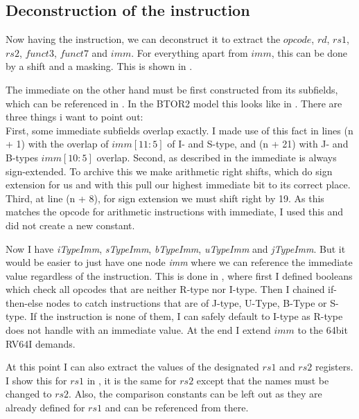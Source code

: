 \subsection{Deconstruction of the instruction}
Now having the instruction, we can deconstruct it to extract the
$opcode$, $rd$, $rs1$, $rs2$, $funct3$, $funct7$ and $imm$. For
everything apart from $imm$, this can be done by a shift and a
masking. This is shown in .

The immediate on the other hand must be first constructed from its
subfields, which can be referenced in . In
the BTOR2 model this looks like in .
 There are three things i
want to point out:\\ First, some immediate subfields overlap exactly.
I made use of this fact in lines (n + 1) with the overlap of
$imm[11:5]$ of I- and S-type, and (n + 21) with J- and B-types
$imm[10:5]$ overlap. Second, as described in 
the immediate is always sign-extended. To archive this we make
arithmetic right shifts, which do sign extension for us and with this
pull our highest immediate bit to its correct place. Third, at line
(n + 8), for sign extension we must shift right by 19. As this
matches the opcode for arithmetic instructions with immediate, I used
this and did not create a new constant.

Now I have \textsl{iTypeImm}, \textsl{sTypeImm}, \textsl{bTypeImm},
\textsl{uTypeImm} and \textsl{jTypeImm}. But it would be easier to
just have one node \textsl{imm} where we can reference the immediate
value regardless of the instruction. This is done in
, where first I defined booleans which check
all opcodes that are neither R-type nor I-type. Then I chained
if-then-else nodes to catch instructions that are of J-type, U-Type,
B-Type or S-type. If the instruction is none of them, I can safely
default to I-type as R-type does not handle with an immediate value.
At the end I extend $imm$ to the 64bit RV64I demands.

At this point I can also extract the values of the designated $rs1$
and $rs2$ registers. I show this for $rs1$ in
, it is the same for $rs2$ except that the
names must be changed to $rs2$. Also, the comparison constants can be
left out as they are already defined for $rs1$ and can be referenced
from there.






